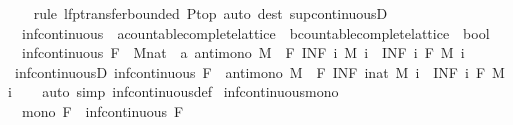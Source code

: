 \begin{isabellebody}
%
\isadelimproof
\ \ %
\endisadelimproof
%
\isatagproof
{}\isamarkupfalse%
\ {\isacharparenleft}rule\ lfp{\isacharunderscore}transfer{\isacharunderscore}bounded{\isacharbrackleft}\ P{\isacharequal}top{\isacharbrackright}{\isacharparenright}\ {\isacharparenleft}auto\ dest{\isacharcolon}\ sup{\isacharunderscore}continuousD{\isacharparenright}%
\endisatagproof
{\isafoldproof}%
%
\isadelimproof
\isanewline
%
\endisadelimproof
\isanewline
{}\isamarkupfalse%
\isanewline
\ \ inf{\isacharunderscore}continuous\ {\isacharcolon}{\isacharcolon}\ {\isachardoublequoteopen}{\isacharparenleft}{\isacharprime}a{\isacharcolon}{\isacharcolon}countable{\isacharunderscore}complete{\isacharunderscore}lattice\ {\isasymRightarrow}\ {\isacharprime}b{\isacharcolon}{\isacharcolon}countable{\isacharunderscore}complete{\isacharunderscore}lattice{\isacharparenright}\ {\isasymRightarrow}\ bool{\isachardoublequoteclose}\isanewline
{}\isanewline
\ \ {\isachardoublequoteopen}inf{\isacharunderscore}continuous\ F\ {\isasymlongleftrightarrow}\ {\isacharparenleft}{\isasymforall}M{\isacharcolon}{\isacharcolon}nat\ {\isasymRightarrow}\ {\isacharprime}a{\isachardot}\ antimono\ M\ {\isasymlongrightarrow}\ F\ {\isacharparenleft}INF\ i{\isachardot}\ M\ i{\isacharparenright}\ {\isacharequal}\ {\isacharparenleft}INF\ i{\isachardot}\ F\ {\isacharparenleft}M\ i{\isacharparenright}{\isacharparenright}{\isacharparenright}{\isachardoublequoteclose}\isanewline
\isanewline
{}\isamarkupfalse%
\ inf{\isacharunderscore}continuousD{\isacharcolon}\ {\isachardoublequoteopen}inf{\isacharunderscore}continuous\ F\ {\isasymLongrightarrow}\ antimono\ M\ {\isasymLongrightarrow}\ F\ {\isacharparenleft}INF\ i{\isacharcolon}{\isacharcolon}nat{\isachardot}\ M\ i{\isacharparenright}\ {\isacharequal}\ {\isacharparenleft}INF\ i{\isachardot}\ F\ {\isacharparenleft}M\ i{\isacharparenright}{\isacharparenright}{\isachardoublequoteclose}\isanewline
%
\isadelimproof
\ \ %
\endisadelimproof
%
\isatagproof
{}\isamarkupfalse%
\ {\isacharparenleft}auto\ simp{\isacharcolon}\ inf{\isacharunderscore}continuous{\isacharunderscore}def{\isacharparenright}%
\endisatagproof
{\isafoldproof}%
%
\isadelimproof
\isanewline
%
\endisadelimproof
\isanewline
{}\isamarkupfalse%
\ inf{\isacharunderscore}continuous{\isacharunderscore}mono{\isacharcolon}\isanewline
\ \ {\isachardoublequoteopen}mono\ F{\isachardoublequoteclose}\ \ {\isachardoublequoteopen}inf{\isacharunderscore}continuous\ F{\isachardoublequoteclose}\isanewline
%

\end{isabellebody}
